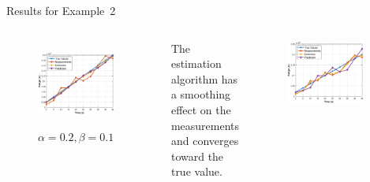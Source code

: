 \begin{frame}{Results for Example~2}
\vspace{-12pt}
\begin{columns}
    \begin{figure}
	    \centering
	    \includegraphics[width=0.9\textwidth]{Figures/Chapter1/ex2_estimationAlgorithm_alpha0.2_beta0.1.eps}
	    \label{fig:ex2_estimationAlgorithm_alpha0.2_beta0.1}
	    \vspace{-15pt}
	    \caption{$\alpha=0.2, \beta=0.1$ }
	    \vspace{-8pt}
	\end{figure}
	The estimation algorithm has a smoothing effect on the measurements and converges toward the true value.
    \begin{figure}
	    \centering
	    \includegraphics[width=0.9\textwidth]{Figures/Chapter1/ex2_estimationAlgorithm_alpha0.8_beta0.5.eps}

\end{figure}
\end{columns}
\end{frame}
